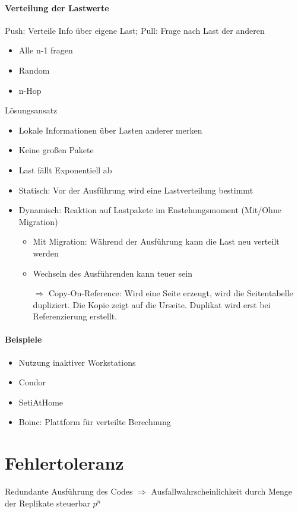 \documentclass{scrartcl}
\begin{document}
\paragraph{Verteilung der Lastwerte}Push: Verteile Info über eigene Last; Pull: Frage nach Last der anderen
\begin{itemize}
\item Alle n-1 fragen
\item Random
\item n-Hop
\end{itemize}
Lösungsansatz
\begin{itemize}
\item Lokale Informationen über Lasten anderer merken
\item Keine großen Pakete
\item Last fällt Exponentiell ab
\item Statisch: Vor der Ausführung wird eine Lastverteilung bestimmt
\item Dynamisch: Reaktion auf Lastpakete im Enstehungsmoment (Mit/Ohne Migration)
\begin{itemize}
\item Mit Migration: Während der Ausführung kann die Last neu verteilt werden
\item Wechseln des Ausführenden kann teuer sein
\item[$\Rightarrow$] Copy-On-Reference: Wird eine Seite erzeugt, wird die Seitentabelle dupliziert. Die Kopie zeigt auf die Urseite. Duplikat wird erst bei Referenzierung erstellt.
\end{itemize}
\end{itemize}

\paragraph{Beispiele}
\begin{itemize}
\item Nutzung inaktiver Workstations
\item Condor
\item SetiAtHome
\item Boinc: Plattform für verteilte Berechnung

\end{itemize}





\newpage
%
%

\section{Fehlertoleranz} \label{fehl}
Redundante Ausführung des Codes $\Rightarrow$ Ausfallwahrscheinlichkeit durch Menge der Replikate steuerbar $p^n$ 
\end{document}
